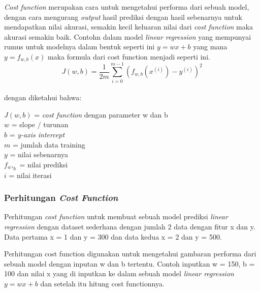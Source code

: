 \textit{Cost function} merupakan cara untuk mengetahui performa dari sebuah model, dengan cara mengurang \textit{output} hasil prediksi dengan hasil sebenarnya untuk mendapatkan nilai akurasi, semakin kecil keluaran nilai dari \textit{cost function} maka akurasi semakin baik\cite{alpaydin2021machine}. Contohn dalam model \textit{linear regression} yang mempunyai rumus untuk modelnya dalam bentuk seperti ini  $y = wx + b$ yang mana $y = f_{w,b}(x)$ maka formula dari cost function menjadi seperti ini.\\
\begin{equation}
    J(w,b) = \frac{1}{2m} \sum\limits_{i = 0}^{m-1} (f_{w,b}(x^{(i)}) - y^{(i)})^2
\end{equation}
\label{eq:2.CostFunction}
\\
dengan diketahui bahwa:
\begin{center}
$J(w,b)$ = \textit{cost function} dengan parameter w dan b\\
$w$ = slope / turunan\\
$b$ = \textit{y-axis intercept}\\
$m$ = jumlah data training\\
$y$ = nilai sebenarnya\\
$f_w,_b$ = nilai prediksi\\
$i$ = nilai iterasi\\
\end{center}

\subsubsection{Perhitungan \textit{Cost Function}} \label{II.costfunction}
Perhitungan \textit{cost function} untuk membuat sebuah model prediksi \textit{linear regression} dengan dataset sederhana dengan jumlah 2 data dengan fitur x dan y. Data pertama x = 1 dan y = 300 dan data kedua x = 2 dan y = 500.

Perhitungan cost function digunakan untuk mengetahui gambaran performa dari sebuah model dengan inputan w dan b tertentu. Contoh inputkan w = 150, b = 100 dan nilai x yang di inputkan ke dalam sebuah model \textit{linear regression} $y = wx + b$ dan setelah itu hitung cost functionnya.

